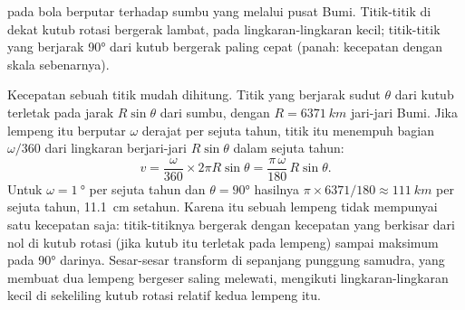 \begin{omfigure}

{\small {} pada bola berputar terhadap sumbu yang melalui pusat Bumi.
Titik-titik di dekat kutub rotasi bergerak lambat, pada lingkaran-lingkaran
kecil; titik-titik yang berjarak \ang{90} dari kutub bergerak paling cepat
(panah: kecepatan dengan skala sebenarnya).}
\end{omfigure}

Kecepatan sebuah titik mudah dihitung. Titik yang berjarak sudut $\theta$ dari
kutub terletak pada jarak $R\sin\theta$ dari sumbu, dengan $R = \qty{6371}{km}$
jari-jari Bumi. Jika lempeng itu berputar $\omega$ derajat per sejuta tahun,
titik itu menempuh bagian $\omega/360$ dari lingkaran berjari-jari $R\sin\theta$
dalam sejuta tahun:
\[
  v = \frac{\omega}{360} \times 2\pi R\sin\theta
    = \frac{\pi\,\omega}{180}\,R\sin\theta .
\]
Untuk $\omega = \qty{1}{\degree}$ per sejuta tahun dan $\theta = \ang{90}$
hasilnya $\pi \times 6371/180 \approx \qty{111}{km}$ per sejuta tahun,
\qty{11.1}{cm} setahun. Karena itu sebuah lempeng tidak mempunyai satu
kecepatan saja: titik-titiknya bergerak dengan kecepatan yang berkisar dari nol
di kutub rotasi (jika kutub itu terletak pada lempeng) sampai maksimum pada
\ang{90} darinya. Sesar-sesar transform di sepanjang punggung samudra, yang
membuat dua lempeng bergeser saling melewati, mengikuti lingkaran-lingkaran
kecil di sekeliling kutub rotasi relatif kedua lempeng itu.


